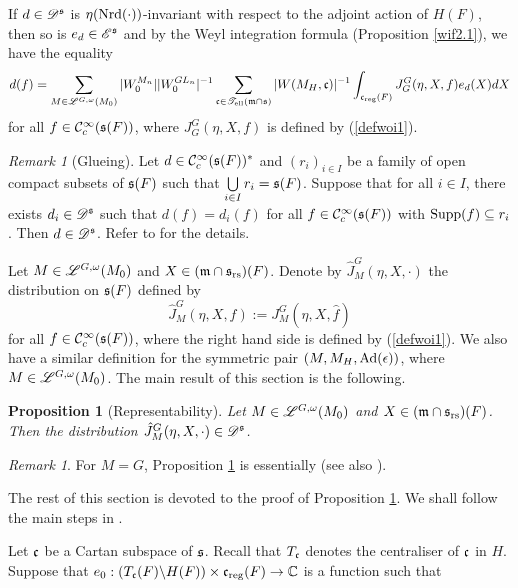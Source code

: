 \documentclass[a4paper]{amsart}
\newcommand{\mse}{\mathscr{E}}\newcommand{\msf}{\mathscr{F}}\newcommand{\msg}{\mathscr{G}}\newcommand{\msh}{\mathscr{H}}
\newcommand{\fm}{{\mathfrak{m}}} \newcommand{\fn}{{\mathfrak{n}}}\newcommand{\fo}{{\mathfrak{o}}} \newcommand{\fp}{{\mathfrak{p}}}
\newtheorem{prop}[thm]{Proposition}
\theoremstyle{definition}
\theoremstyle{remark}
\newtheorem{remark}[thm]{Remark}
\numberwithin{equation}{subsection}
\begin{document}
If $d\in\mathscr{D}^{\mathfrak{s}}$ is $\eta({\mathrm{Nrd}}(\cdot))$-invariant with respect to the adjoint action of $H(F)$, then so is $e_d\in\mse^\fs$ and by the Weyl integration formula (Proposition \ref{wif2.1}), we have the equality
\begin{equation}\label{equV.6inv1}
 d(f)=\sum_{M\in\msl^{G,\omega}(M_0)} |W_0^{M_n}| |W_0^{GL_n}|^{-1} \sum_{\fc\in\mst_\el(\fm\cap\fs)} |W(M_H, \fc)|^{-1} \int_{\fc_\reg(F)} J_G^G(\eta, X, f) e_d(X) dX 
\end{equation}
for all $f\in{\mathcal {C}}_c^\infty({\mathfrak{s}}(F))$, where $J_G^G(\eta, X, f)$ is defined by (\ref{defwoi1}). 

\begin{remark}[Glueing]\label{gluermk}
Let $d\in{\mathcal {C}}_c^\infty({\mathfrak{s}}(F))^*$ and $(r_i)_{i\in I}$ be a family of open compact subsets of ${\mathfrak{s}}(F)$ such that $\bigcup\limits_{i\in I} r_i={\mathfrak{s}}(F)$. Suppose that for all $i\in I$, there exists $d_i\in\mathscr{D}^{\mathfrak{s}}$ such that $d(f)=d_i(f)$ for all $f\in{\mathcal {C}}_c^\infty({\mathfrak{s}}(F))$ with ${\mathrm{Supp}}(f)\subseteq r_i$. Then $d\in\mathscr{D}^{\mathfrak{s}}$. Refer to \cite[Remarque V.6]{MR1344131} for the details. 
\end{remark}

Let $M\in\mathscr{L}^{G,\omega}(M_0)$ and $X\in(\fm\cap\fs_\rs)(F)$. Denote by $\hat{J}_M^G(\eta, X, \cdot)$ the distribution on ${\mathfrak{s}}(F)$ defined by
$$ \hat{J}_M^G(\eta, X, f):=J_M^G(\eta, X, \hat{f}) $$
for all $f\in{\mathcal {C}}_c^\infty({\mathfrak{s}}(F))$, where the right hand side is defined by (\ref{defwoi1}). We also have a similar definition for the symmetric pair $(M, M_H, {\mathrm{Ad}}(\epsilon))$, where $M\in\mathscr{L}^{G,\omega}(M_0)$. The main result of this section is the following. 

\begin{prop}[Representability]\label{repr1}
Let $M\in\mathscr{L}^{G,\omega}(M_0)$ and $X\in(\fm\cap\fs_\rs)(F)$. Then the distribution $\hat{J}_M^G(\eta, X, \cdot)\in\mathscr{D}^{\mathfrak{s}}$. 
\end{prop}

\begin{remark}
For $M=G$, Proposition \ref{repr1} is essentially \cite[Theorem 6.1.(i)]{MR3414387} (see also \cite[Theorem 6.2]{MR3299843}). 
\end{remark}

The rest of this section is devoted to the proof of Proposition \ref{repr1}. We shall follow the main steps in \cite[\S V.7-10]{MR1344131}. 

Let ${\mathfrak{c}}$ be a Cartan subspace of ${\mathfrak{s}}$. Recall that $T_{\mathfrak{c}}$ denotes the centraliser of ${\mathfrak{c}}$ in $H$. Suppose that $e_0: (T_{\mathfrak{c}}(F)\backslash H(F))\times {\mathfrak{c}}_{\mathrm{reg}}(F)\rightarrow{\mathbb {C}}$ is a function such that
\end{document}
